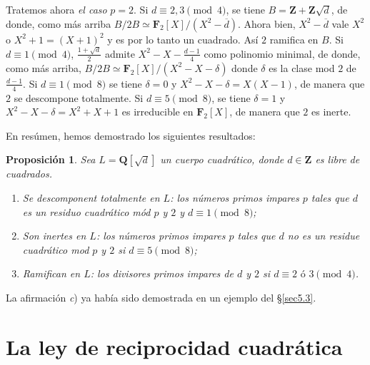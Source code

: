 \documentclass[10pt,oneside,bibtotoc,smallheadings,leqno,a5paper,DIV=12]{scrbook}
\newcommand{\QQ}{\mathbf{Q}}
\newcommand{\ZZ}{\mathbf{Z}}
\newcommand{\FF}{\mathbf{F}}
\newcommand{\oline}[1]{\overline{#1}}
\numberwithin{equation}{section}
\theoremstyle{defi}
\theoremstyle{enonce}
\newtheorem{proposition}{Proposici\'on}
\theoremstyle{rem}
\numberwithin{theorem}{section}
\numberwithin{proposition}{section}
\numberwithin{definition}{section}
\numberwithin{lemma}{section}
\numberwithin{corollary}{section}
\numberwithin{example}{section}
\numberwithin{footnote}{section}%
\begin{document}
Tratemos ahora {\em el caso} $p=2$. Si $d\equiv 2, 3\pmod 4$, se tiene $B=\ZZ+\ZZ\sqrt{d}$, de donde,
como m\'as arriba $B/2B\simeq\FF_{2}[X]/(X^{2}-\oline d)$. Ahora bien, $X^{2}-\oline d$ vale $X^{2}$
o $X^{2}+1 = (X+1)^{2}$ y es por lo tanto un cuadrado. As\'i $2$ ramifica en $B$. Si $d\equiv 1\pmod 4$,
$\frac{1+\sqrt{d}}{2}$ admite $X^{2}-X-\frac{d-1}{4}$ como polinomio minimal, de donde, como m\'as arriba,
$B/2B\simeq\FF_{2}[X]/(X^{2}-X-\delta)$ donde $\delta$ es la clase mod $2$ de $\frac{d-1}{4}$. Si
$d\equiv 1\pmod 8$ se tiene $\delta=0$ y $X^{2}-X-\delta=X(X-1)$, de manera que $2$ se descompone
totalmente. Si $d\equiv 5\pmod 8$, se tiene $\delta=1$ y $X^{2}-X-\delta=X^{2}+X+1$ es irreducible en
$\FF_{2}[X]$, de manera que $2$ es inerte.

En res\'umen, hemos demostrado los siguientes resultados:

\begin{proposition}\label{prop5.4.1}
Sea $L = \QQ[\sqrt{d}]$ un cuerpo cuadr\'atico, donde $d\in\ZZ$ es libre de cuadrados.
\begin{enumerate}
\item Se descomponent totalmente en $L$: los n\'umeros primos impares $p$ tales que
$d$ es un residuo cuadr\'atico m\'od $p$ y $2$ y $d\equiv 1\pmod 8$;
\item Son inertes en $L${\upshape:} los n\'umeros primos impares $p$ tales que $d$ no es un
residue cuadr\'atico mod $p$ y $2$ si $d\equiv 5\pmod 8$;
\item Ramifican en $L$: los divisores primos impares de $d$ y $2$ si $d\equiv 2\text{ \'o }3\pmod 4$.
\end{enumerate}
\end{proposition}

La afirmaci\'on {\itshape c}) ya hab\'ia sido demostrada en un ejemplo del \S\ref{sec5.3}.

\section{La ley de reciprocidad cuadr\'atica}\label{sec5.5}
\end{document}
